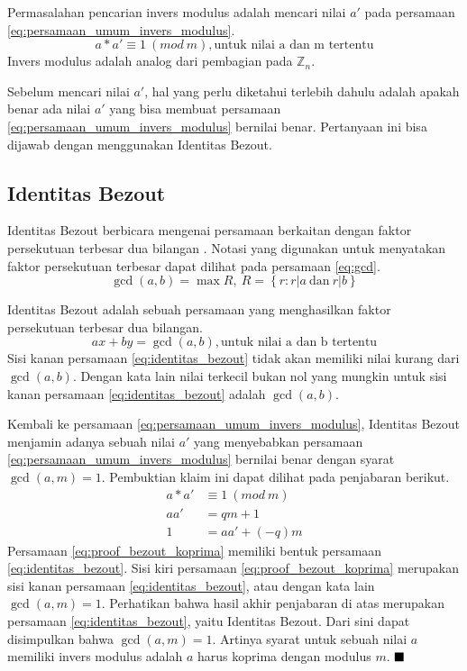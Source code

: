 Permasalahan pencarian invers modulus adalah mencari nilai $ a' $ pada persamaan \eqref{eq:persamaan_umum_invers_modulus}.
\begin{equation}
a * a' \equiv 1\ (mod\ m), \text{untuk nilai a dan m tertentu}
\label{eq:persamaan_umum_invers_modulus}
\end{equation}
Invers modulus adalah analog dari pembagian pada $ \mathbb{Z}_n $.

Sebelum mencari nilai $ a' $, hal yang perlu diketahui terlebih dahulu adalah apakah benar ada nilai $ a' $ yang bisa membuat persamaan \eqref{eq:persamaan_umum_invers_modulus} bernilai benar. Pertanyaan ini bisa dijawab dengan menggunakan Identitas Bezout.

\subsection{Identitas Bezout}

Identitas Bezout berbicara mengenai persamaan berkaitan dengan faktor persekutuan terbesar dua bilangan \cite{brilliant_bezout}. Notasi yang digunakan untuk menyatakan faktor persekutuan terbesar dapat dilihat pada persamaan \eqref{eq:gcd}.
\begin{equation}
\gcd⁡(a,b)=\max R,\ R=\left\{r:r|a\ \text{dan} \ r|b\right\}
\label{eq:gcd}
\end{equation}

Identitas Bezout adalah sebuah persamaan yang menghasilkan faktor persekutuan terbesar dua bilangan.
\begin{equation}
ax+by=\gcd(a,b), \text{untuk nilai a dan b tertentu}
\label{eq:identitas_bezout}
\end{equation}
Sisi kanan persamaan \eqref{eq:identitas_bezout} tidak akan memiliki nilai kurang dari $ \gcd (a,b) $. Dengan kata lain nilai terkecil bukan nol yang mungkin untuk sisi kanan persamaan \eqref{eq:identitas_bezout} adalah $ \gcd (a,b) $.

Kembali ke persamaan \eqref{eq:persamaan_umum_invers_modulus}, Identitas Bezout menjamin adanya sebuah nilai $ a' $ yang menyebabkan persamaan \eqref{eq:persamaan_umum_invers_modulus} bernilai benar dengan syarat $ \gcd (a,m) = 1 $. Pembuktian klaim ini dapat dilihat pada penjabaran berikut.
\begin{align}
a * a' &\equiv 1\ (mod\ m) \\
aa' &= qm + 1 \\
1 &= aa' + (-q)m
\label{eq:proof_bezout_koprima}
\end{align}
Persamaan \eqref{eq:proof_bezout_koprima} memiliki bentuk persamaan \eqref{eq:identitas_bezout}. Sisi kiri persamaan \eqref{eq:proof_bezout_koprima} merupakan sisi kanan persamaan \eqref{eq:identitas_bezout}, atau dengan kata lain $ \gcd (a, m) = 1 $. Perhatikan bahwa hasil akhir penjabaran di atas merupakan persamaan \eqref{eq:identitas_bezout}, yaitu Identitas Bezout. Dari sini dapat disimpulkan bahwa $ \gcd (a, m)=1 $. Artinya syarat untuk sebuah nilai $ a $ memiliki invers modulus adalah $ a $ harus koprima dengan modulus $ m $. \hfill $ \blacksquare $

